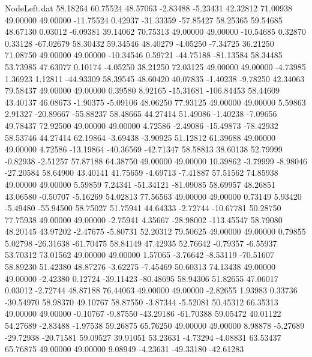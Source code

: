 \begin{filecontents}{NodeLeft.dat}
  58.18264   60.75524   48.57063    -2.83488   -5.23431   42.32812   71.00938   49.00000   49.00000  -11.75524    0.42937  -31.33359  -57.85427
  58.25365   59.54685   48.67130     0.03012   -6.09381   39.14062   70.75313   49.00000   49.00000  -10.54685    0.32870    0.33128  -67.02679
  58.30432   59.34546   48.40279    -4.05250   -7.34725   36.21250   71.08750   49.00000   49.00000  -10.34546    0.59721  -44.75188  -81.13584
  58.34485   53.73985   47.63077     0.10174   -4.05250   38.21250   72.03125   49.00000   49.00000   -4.73985    1.36923    1.12811  -44.93309
  58.39545   48.60420   40.07835    -1.40238   -9.78250   42.34063   79.58437   49.00000   49.00000    0.39580    8.92165  -15.31681 -106.84453
  58.44609   43.40137   46.08673    -1.90375   -5.09106   48.06250   77.93125   49.00000   49.00000    5.59863    2.91327  -20.89667  -55.88237
  58.48665   44.27414   51.49086    -1.40238   -7.09656   49.78437   72.92500   49.00000   49.00000    4.72586   -2.49086  -15.49873  -78.42932
  58.53746   44.27414   62.19864    -3.69438   -3.90925   51.12812   61.39688   49.00000   49.00000    4.72586  -13.19864  -40.36569  -42.71347
  58.58813   38.60138   52.79999    -0.82938   -2.51257   57.87188   64.38750   49.00000   49.00000   10.39862   -3.79999   -8.98046  -27.20584
  58.64900   43.40141   41.75659    -4.69713   -7.41887   57.51562   74.85938   49.00000   49.00000    5.59859    7.24341  -51.34121  -81.09085
  58.69957   48.26851   43.06580    -0.50707   -5.16269   54.02813   77.56563   49.00000   49.00000    0.73149    5.93420   -5.49480  -55.94500
  58.75027   51.75941   44.64333    -2.72744  -10.67781   50.28750   77.75938   49.00000   49.00000   -2.75941    4.35667  -28.98002 -113.45547
  58.79080   48.20145   43.97202    -2.47675   -5.80731   52.20312   79.50625   49.00000   49.00000    0.79855    5.02798  -26.31638  -61.70475
  58.84149   47.42935   52.76642    -0.79357   -6.55937   53.70312   73.01562   49.00000   49.00000    1.57065   -3.76642   -8.53119  -70.51607
  58.89230   51.42380   48.87276    -3.62275   -7.45469   50.60313   74.13438   49.00000   49.00000   -2.42380    0.12724  -39.11423  -80.48695
  58.94306   51.82655   47.06017     0.03012   -2.72744   48.87188   76.44063   49.00000   49.00000   -2.82655    1.93983    0.33736  -30.54970
  58.98370   49.10767   58.87550    -3.87344   -5.52081   50.45312   66.35313   49.00000   49.00000   -0.10767   -9.87550  -43.29186  -61.70388
  59.05472   40.01122   54.27689    -2.83488   -1.97538   59.26875   65.76250   49.00000   49.00000    8.98878   -5.27689  -29.72938  -20.71581
  59.09527   39.91051   53.23631    -4.73294   -4.08831   63.53437   65.76875   49.00000   49.00000    9.08949   -4.23631  -49.33180  -42.61283

\end{filecontents}
